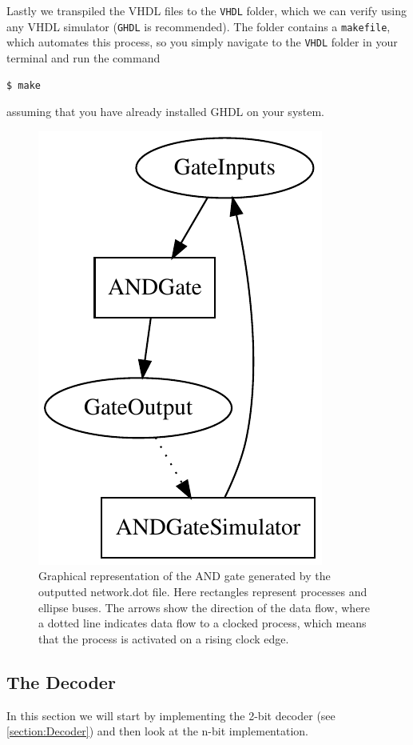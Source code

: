         Lastly we transpiled the VHDL files to the \texttt{VHDL} folder, which we can verify using any VHDL simulator (\texttt{GHDL} is recommended). The folder contains a \texttt{makefile}, which automates this process, so you simply navigate to the \texttt{VHDL} folder in your terminal and run the command
        \begin{lstlisting}[language=bash]
$ make
        \end{lstlisting}
        assuming that you have already installed GHDL on your system.
        
        \begin{figure}[h!]
                \centering
                \includegraphics{pictures/ANDGate.pdf}
                \caption{Graphical representation of the AND gate generated by the outputted network.dot file. Here rectangles represent processes and ellipse buses. The arrows show the direction of the data flow, where a dotted line indicates data flow to a clocked process, which means that the process is activated on a rising clock edge.}
                \label{fig:ANDGateDOTFile}
            
        \end{figure} 
    
    \subsection{The Decoder}
        In this section we will start by implementing the 2-bit decoder (see \ref{section:Decoder}) and then look at the n-bit implementation. 
        
